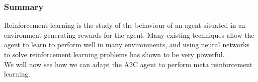 \subsubsection{Summary}
Reinforcement learning is the study of the behaviour of an agent situated in
an environment generating rewards for the agent. Many existing techniques
allow the agent to learn to perform well in many environments, and 
using neural networks to solve reinforcement learning problems has shown
to be very powerful.\\

We will now see how we can adapt the A2C agent to perform meta reinforcement
learning.


